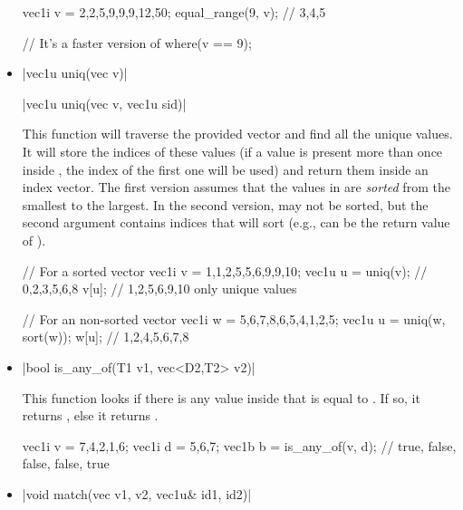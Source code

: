 \documentclass[12pt]{report}
\newcommand*\circled[1]{\tikz[baseline=(char.base)]{
            \node[shape=circle,draw,inner sep=0.0pt] (char) {#1};}}
\newcommand{\vectorfuncsym}{\circled{$\hspace{-1pt}\mathcal{V}$}\xspace}
\newcommand{\vectorfunc}{\vectorfuncsym\hspace{2pt}\xspace}
\newenvironment{example}
{
    \begin{mdframed}[style=example,frametitle={Example}]
}
{
    \end{mdframed}
}
\newcommand{\cpptrue}{\cppinline{true}\xspace}
\newcommand{\cppfalse}{\cppinline{false}\xspace}
\begin{document}
\begin{itemize}
\begin{example}
\begin{cppcode}
vec1i v = {2,2,5,9,9,9,12,50};
equal_range(9, v); // {3,4,5}

// It's a faster version of
where(v == 9);
\end{cppcode}
\end{example}

\item \cppinline|vec1u uniq(vec v)| 

\cppinline|vec1u uniq(vec v, vec1u sid)|

This function will traverse the provided vector  and find all the unique values. It will store the indices of these values (if a value is present more than once inside , the index of the first one will be used) and return them inside an index vector. The first version assumes that the values in  are \emph{sorted} from the smallest to the largest. In the second version,  may not be sorted, but the second argument  contains indices that will sort  (e.g.,  can be the return value of ).

\begin{example}
\begin{cppcode}
// For a sorted vector
vec1i v = {1,1,2,5,5,6,9,9,10};
vec1u u = uniq(v); // {0,2,3,5,6,8}
v[u]; // {1,2,5,6,9,10} only unique values

// For an non-sorted vector
vec1i w = {5,6,7,8,6,5,4,1,2,5};
vec1u u = uniq(w, sort(w));
w[u]; // {1,2,4,5,6,7,8}
\end{cppcode}
\end{example}

\item \vectorfunc \cppinline|bool is_any_of(T1 v1, vec<D2,T2> v2)| 

This function looks if there is any value inside  that is equal to . If so, it returns \cpptrue, else it returns \cppfalse.

\begin{example}
\begin{cppcode}
vec1i v = {7,4,2,1,6};
vec1i d = {5,6,7};
vec1b b = is_any_of(v, d); // {true, false, false, false, true}
\end{cppcode}
\end{example}

\item \cppinline|void match(vec v1, v2, vec1u& id1, id2)| 


\end{itemize}
\end{document}
